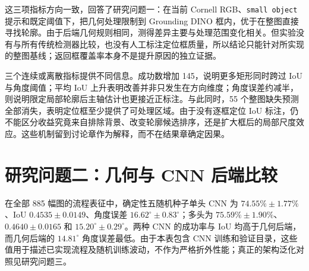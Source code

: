 \documentclass{l4proj}
\begin{document}
这三项指标方向一致，回答了研究问题一：在当前 Cornell RGB、\texttt{small object} 提示和既定阈值下，把几何处理限制到 Grounding DINO 框内，优于在整图直接寻找轮廓。由于后端几何规则相同，测得差异主要与处理范围变化相关。但实验没有与所有传统检测器比较，也没有人工标注定位框质量，所以结论只能针对所实现的整图基线；返回框覆盖率本身不是提升原因的独立证据。

三个连续或离散指标提供不同信息。成功数增加 145，说明更多矩形同时跨过 IoU 与角度阈值；平均 IoU 上升表明改善并非只发生在方向维度；角度误差约减半，则说明限定局部轮廓后主轴估计也更接近正标注。与此同时，55 个整图缺失预测全部消失，表明定位框至少提供了可处理区域。由于没有逐框定位 IoU 标注，仍不能区分收益究竟来自排除背景、改变轮廓候选排序，还是扩大框后的局部尺度效应。这些机制留到讨论章作为解释，而不在结果章确定因果。

\begin{table}[htbp]
  \centering
  \caption{全部 885 幅 Cornell 图像上的流程表征结果。CNN 数值为随机种子 42--46 的均值 $\pm$ 总体标准差；其包含训练与验证目录，不作为纯折外泛化估计。}
  \label{tab:main-results}
\end{table}

\section{研究问题二：几何与 CNN 后端比较}
在全部 885 幅图的流程表征中，确定性五随机种子单头 CNN 为 $74.55\%\pm1.77\%$、IoU $0.4535\pm0.0149$、角度误差 $16.62^\circ\pm0.83^\circ$；多头为 $75.59\%\pm1.90\%$、$0.4640\pm0.0165$ 和 $15.20^\circ\pm0.29^\circ$。两种 CNN 的成功率与 IoU 均高于几何后端，而几何后端的 $14.81^\circ$ 角度误差最低。由于本表包含 CNN 训练和验证目录，这些值用于描述已实现流程及随机训练波动，不作为严格折外性能；真正的架构泛化对照见研究问题三。
\end{document}
